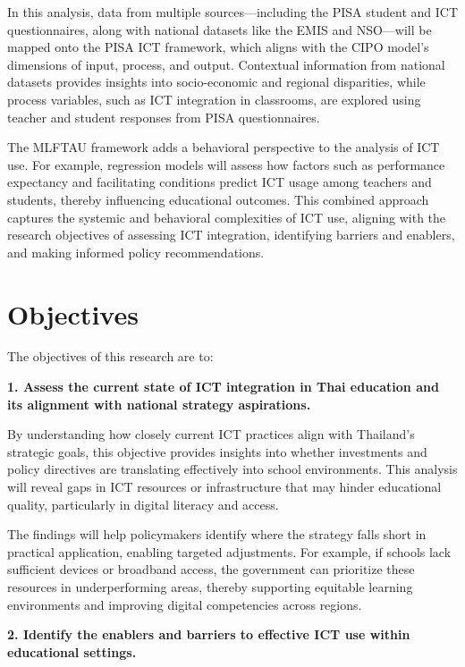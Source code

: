 \documentclass[
]{article}
\begin{document}
In this analysis, data from multiple sources---including the PISA
student and ICT questionnaires, along with national datasets like the
EMIS and NSO---will be mapped onto the PISA ICT framework, which aligns
with the CIPO model's dimensions of input, process, and output.
Contextual information from national datasets provides insights into
socio-economic and regional disparities, while process variables, such
as ICT integration in classrooms, are explored using teacher and student
responses from PISA questionnaires.

The MLFTAU framework adds a behavioral perspective to the analysis of
ICT use. For example, regression models will assess how factors such as
performance expectancy and facilitating conditions predict ICT usage
among teachers and students, thereby influencing educational outcomes.
This combined approach captures the systemic and behavioral complexities
of ICT use, aligning with the research objectives of assessing ICT
integration, identifying barriers and enablers, and making informed
policy recommendations.

\hypertarget{objectives}{%
\section{Objectives}\label{objectives}}

The objectives of this research are to:

\textbf{1. Assess the current state of ICT integration in Thai education
and its alignment with national strategy aspirations.}

By understanding how closely current ICT practices align with Thailand's
strategic goals, this objective provides insights into whether
investments and policy directives are translating effectively into
school environments. This analysis will reveal gaps in ICT resources or
infrastructure that may hinder educational quality, particularly in
digital literacy and access.

The findings will help policymakers identify where the strategy falls
short in practical application, enabling targeted adjustments. For
example, if schools lack sufficient devices or broadband access, the
government can prioritize these resources in underperforming areas,
thereby supporting equitable learning environments and improving digital
competencies across regions.

\textbf{2. Identify the enablers and barriers to effective ICT use
within educational settings.}
\end{document}
